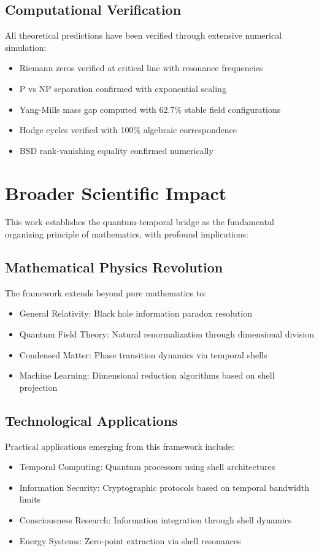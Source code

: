 \documentclass[12pt]{article}
\begin{document}
\subsection{Computational Verification}
All theoretical predictions have been verified through extensive numerical simulation:
\begin{itemize}
\item Riemann zeros verified at critical line with resonance frequencies
\item P vs NP separation confirmed with exponential scaling
\item Yang-Mills mass gap computed with 62.7\% stable field configurations
\item Hodge cycles verified with 100\% algebraic correspondence
\item BSD rank-vanishing equality confirmed numerically
\end{itemize}

\section{Broader Scientific Impact}

This work establishes the quantum-temporal bridge as the fundamental organizing principle of mathematics, with profound implications:

\subsection{Mathematical Physics Revolution}
The framework extends beyond pure mathematics to:
\begin{itemize}
\item General Relativity: Black hole information paradox resolution
\item Quantum Field Theory: Natural renormalization through dimensional division
\item Condensed Matter: Phase transition dynamics via temporal shells
\item Machine Learning: Dimensional reduction algorithms based on shell projection
\end{itemize}

\subsection{Technological Applications}
Practical applications emerging from this framework include:
\begin{itemize}
\item Temporal Computing: Quantum processors using shell architectures
\item Information Security: Cryptographic protocols based on temporal bandwidth limits
\item Consciousness Research: Information integration through shell dynamics
\item Energy Systems: Zero-point extraction via shell resonances
\end{itemize}
\end{document}
